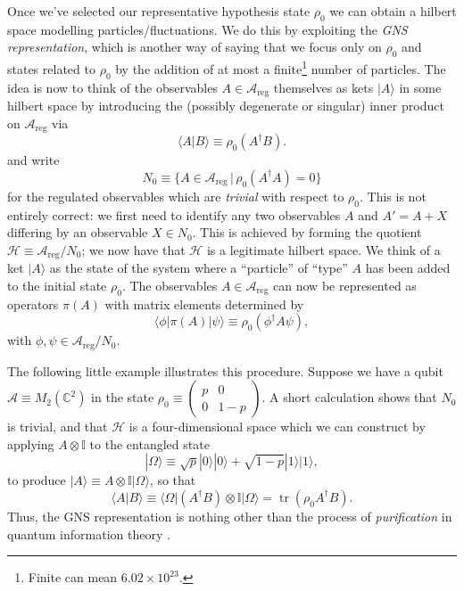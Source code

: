 \documentclass[11pt]{amsart}
\DeclareMathOperator{\tr}{tr}
\theoremstyle{plain}%
\theoremstyle{definition}
\theoremstyle{remark}
\begin{document}
Once we've selected our representative hypothesis state $\rho_0$ we can obtain a hilbert space modelling particles/fluctuations. We do this by exploiting the \emph{GNS representation}, which is another way of saying that we focus only on $\rho_0$ and states related to $\rho_0$ by the addition of at most a finite\footnote{Finite can mean $6.02\times 10^{23}$.} number of particles. The idea is now to think of the observables $A\in \mathcal{A}_{\text{reg}}$ themselves as kets $|A\rangle$ in some hilbert space by introducing the (possibly degenerate or singular) inner product on $\mathcal{A}_{\text{reg}}$ via
\begin{equation}
	\langle A|B\rangle \equiv \rho_0 (A^\dag B).
\end{equation}
and write
\begin{equation}
	N_{0} \equiv \{A\in \mathcal{A}_{\text{reg}}\,|\, \rho_0(A^\dag A)=0\}
\end{equation}
for the regulated observables which are \emph{trivial} with respect to $\rho_0$. This is not entirely correct: we first need to identify any two observables $A$ and $A' = A + X$ differing by an observable $X\in N_0$. This is achieved by forming the quotient $\mathcal{H} \equiv \mathcal{A}_{\text{reg}}/N_0$; we now have that $\mathcal{H}$ is a legitimate hilbert space. We think of a ket $|A\rangle$ as the state of the system where a ``particle'' of ``type'' $A$ has been added to the initial state $\rho_0$. The observables $A\in\mathcal{A}_{\text{reg}}$ can now be represented as operators $\pi(A)$ with matrix elements determined by
\begin{equation}
	\langle \phi|\pi(A)|\psi\rangle \equiv \rho_0(\phi^\dag A \psi),
\end{equation}
with $\phi,\psi \in  \mathcal{A}_{\text{reg}}/N_0$. 

The following little example illustrates this procedure. Suppose we have a qubit $\mathcal{A}\equiv M_2(\mathbb{C}^2)$ in the state $\rho_0 \equiv \left(\begin{smallmatrix}
p&0\\ 0&1-p
\end{smallmatrix}\right)$. A short calculation shows that $N_0$ is trivial, and that $\mathcal{H}$ is a four-dimensional space which we can construct by applying $A\otimes \mathbb{I}$ to the entangled state
\begin{equation}
	|\Omega\rangle \equiv \sqrt{p}|0\rangle|0\rangle + \sqrt{1-p}|1\rangle|1\rangle,
\end{equation}
to produce $|A\rangle \equiv A\otimes\mathbb{I}|\Omega\rangle$, so that  
\begin{equation}
	\langle A|B\rangle \equiv \langle\Omega|(A^\dag B) \otimes \mathbb{I}|\Omega\rangle = \tr(\rho_0 A^\dag B).
\end{equation}
Thus, the GNS representation is nothing other than the process of \emph{purification} in quantum information theory \cite{nielsen_quantum_2000}.
\end{document}
